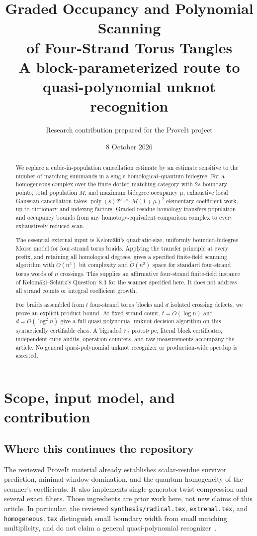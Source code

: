 \documentclass[11pt,letterpaper]{article}
\title{\textbf{Graded Occupancy and Polynomial Scanning\\of Four-Strand Torus Tangles}\\[6pt]\large A block-parameterized route to quasi-polynomial unknot recognition}
\author{Research contribution prepared for the ProveIt project}
\date{8 October 2026}
\theoremstyle{remark}\newtheorem{remark}[theorem]{Remark}
\newcommand{\F}{\mathbb F}
\newcommand{\poly}{\operatorname{poly}}
\begin{document}
\maketitle
\begin{abstract}
We replace a cubic-in-population cancellation estimate by an estimate sensitive to the number of matching summands in a single homological--quantum bidegree. For a homogeneous complex over the finite dotted matching category with $2s$ boundary points, total population $M$, and maximum bidegree occupancy $\mu$, exhaustive local Gaussian cancellation takes $\poly(s)2^{O(s)}M(1+\mu)^2$ elementary coefficient work, up to dictionary and indexing factors. Graded residue homology transfers population and occupancy bounds from any homotopy-equivalent comparison complex to every exhaustively reduced scan.

The essential external input is Kelom\"aki's quadratic-size, uniformly bounded-bidegree Morse model for four-strand torus braids. Applying the transfer principle at every prefix, and retaining all homological degrees, gives a specified finite-field scanning algorithm with $\widetilde O(n^3)$ bit complexity and $\widetilde O(n^2)$ space for standard four-strand torus words of $n$ crossings. This supplies an affirmative four-strand finite-field instance of Kelom\"aki--Sch\"utz's Question~8.3 for the scanner specified here. It does not address all strand counts or integral coefficient growth.

For braids assembled from $t$ four-strand torus blocks and $d$ isolated crossing defects, we prove an explicit product bound. At fixed strand count, $t=O(\log n)$ and $d=O(\log^2 n)$ give a full quasi-polynomial unknot decision algorithm on this syntactically certifiable class. A bigraded $\F_2$ prototype, literal block certificates, independent cube audits, operation counters, and raw measurements accompany the article. No general quasi-polynomial unknot recognizer or production-wide speedup is asserted.
\end{abstract}
\tableofcontents
\newpage

\section{Scope, input model, and contribution}
\subsection{Where this continues the repository}
The reviewed ProveIt material already establishes scalar-residue survivor prediction, minimal-window domination, and the quantum homogeneity of the scanner's coefficients. It also implements single-generator twist compression and several exact filters. Those ingredients are prior work here, not new claims of this article. In particular, the reviewed \texttt{synthesis/radical.tex}, \texttt{extremal.tex}, and \texttt{homogeneous.tex} distinguish small boundary width from small matching multiplicity, and do not claim a general quasi-polynomial recognizer~\cite{Repo}.
\end{document}

